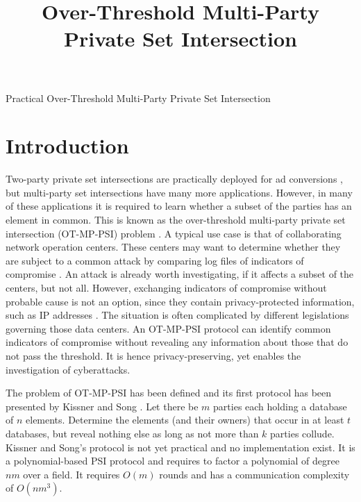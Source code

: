 \documentclass[10pt, sigconf]{acmart}
\title{Over-Threshold Multi-Party Private Set Intersection}
\date{}
\begin{document}
\pagestyle{plain} %
\onecolumn
\begingroup
\centering
{\Huge Practical Over-Threshold Multi-Party Private Set Intersection}\\[3em]
\endgroup

\section{Introduction}

Two-party private set intersections are practically deployed for ad conversions \cite{}, but multi-party set intersections have many more applications.
However, in many of these applications it is required to learn whether a subset of the parties has an element in common.
This is known as the over-threshold multi-party private set intersection (OT-MP-PSI) problem \cite{Kissner}.
A typical use case is that of collaborating network operation centers.
These centers may want to determine whether they are subject to a common attack by comparing log files of indicators of compromise \cite{}.
An attack is already worth investigating, if it affects a subset of the centers, but not all.
However, exchanging indicators of compromise without probable cause is not an option, since they contain privacy-protected information, such as IP addresses \cite{}.
The situation is often complicated by different legislations governing those data centers.
An OT-MP-PSI protocol can identify common indicators of compromise without revealing any information about those that do not pass the threshold.
It is hence privacy-preserving, yet enables the investigation of cyberattacks.

The problem of OT-MP-PSI has been defined and its first protocol has been presented by Kissner and Song \cite{Kissner}.
Let there be $m$ parties each holding a database of $n$ elements.
Determine the elements (and their owners) that occur in at least $t$ databases, but reveal nothing else as long as not more than $k$ parties collude.
Kissner and Song's protocol is not yet practical and no implementation exist.
It is a polynomial-based PSI protocol and requires to factor a polynomial of degree $nm$ over a field.
It requires $O(m)$ rounds and has a communication complexity of $O(nm^3)$.
\end{document}
